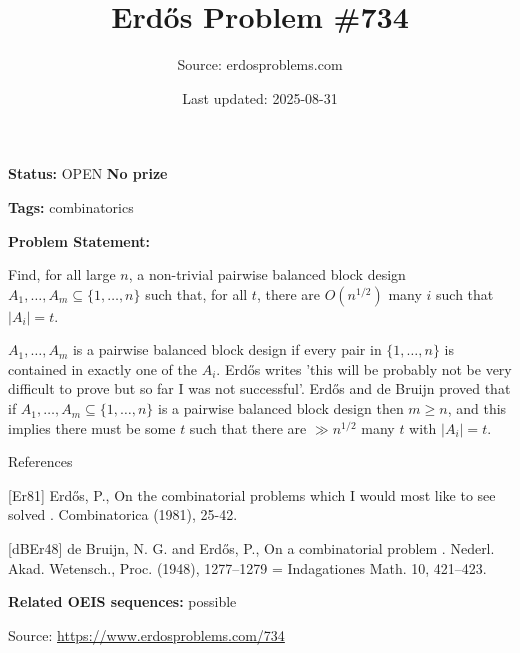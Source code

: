 \documentclass{article}
\title{Erd\H{o}s Problem \#734}
\date{Last updated: 2025-08-31}
\author{Source: erdosproblems.com}
\begin{document}
\maketitle

\noindent\textbf{Status:} OPEN \quad \textbf{No prize}

\noindent\textbf{Tags:} combinatorics

\medskip

\noindent\textbf{Problem Statement:}

Find, for all large $n$, a non-trivial pairwise balanced block design $A_1,\ldots,A_m\subseteq \{1,\ldots,n\}$ such that, for all $t$, there are $O(n^{1/2})$ many $i$ such that $\lvert A_i\rvert=t$.




$A_1,\ldots,A_m$ is a pairwise balanced block design if every pair in $\{1,\ldots,n\}$ is contained in exactly one of the $A_i$. Erd\H{o}s \cite{Er81} writes 'this will be probably not be very difficult to prove but so far I was not successful'. Erd\H{o}s and de Bruijn \cite{dBEr48} proved that if $A_1,\ldots,A_m\subseteq \{1,\ldots,n\}$ is a pairwise balanced block design then $m\geq n$, and this implies there must be some $t$ such that there are $\gg n^{1/2}$ many $t$ with $\lvert A_i\rvert=t$.




References

[Er81] Erd\H{o}s, P., On the combinatorial problems which I would most like to see solved . Combinatorica (1981), 25-42.

[dBEr48] de Bruijn, N. G. and Erd\H{o}s, P., On a combinatorial problem . Nederl. Akad. Wetensch., Proc. (1948), 1277--1279 = Indagationes Math. 10, 421--423.

\noindent\textbf{Related OEIS sequences:} possible


\bigskip
\noindent\small{Source: \url{https://www.erdosproblems.com/734}}
\end{document}
